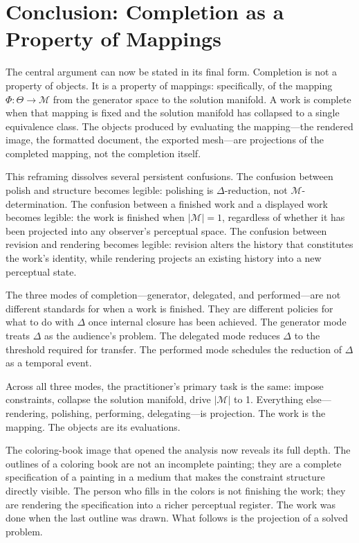 \documentclass[11pt, twoside]{article}
\theoremstyle{plain}
\theoremstyle{definition}
\theoremstyle{remark}
\begin{document}
\section{Conclusion: Completion as a Property of Mappings}
\label{sec:conclusion}

The central argument can now be stated in its final form. Completion is not a property of objects. It is a property of mappings: specifically, of the mapping $\Phi : \Theta \to \mathcal{M}$ from the generator space to the solution manifold. A work is complete when that mapping is fixed and the solution manifold has collapsed to a single equivalence class. The objects produced by evaluating the mapping---the rendered image, the formatted document, the exported mesh---are projections of the completed mapping, not the completion itself.

This reframing dissolves several persistent confusions. The confusion between polish and structure becomes legible: polishing is $\Delta$-reduction, not $\mathcal{M}$-determination. The confusion between a finished work and a displayed work becomes legible: the work is finished when $|\mathcal{M}| = 1$, regardless of whether it has been projected into any observer's perceptual space. The confusion between revision and rendering becomes legible: revision alters the history that constitutes the work's identity, while rendering projects an existing history into a new perceptual state.

The three modes of completion---generator, delegated, and performed---are not different standards for when a work is finished. They are different policies for what to do with $\Delta$ once internal closure has been achieved. The generator mode treats $\Delta$ as the audience's problem. The delegated mode reduces $\Delta$ to the threshold required for transfer. The performed mode schedules the reduction of $\Delta$ as a temporal event.

Across all three modes, the practitioner's primary task is the same: impose constraints, collapse the solution manifold, drive $|\mathcal{M}|$ to 1. Everything else---rendering, polishing, performing, delegating---is projection. The work is the mapping. The objects are its evaluations.

The coloring-book image that opened the analysis now reveals its full depth. The outlines of a coloring book are not an incomplete painting; they are a complete specification of a painting in a medium that makes the constraint structure directly visible. The person who fills in the colors is not finishing the work; they are rendering the specification into a richer perceptual register. The work was done when the last outline was drawn. What follows is the projection of a solved problem.
\end{document}
